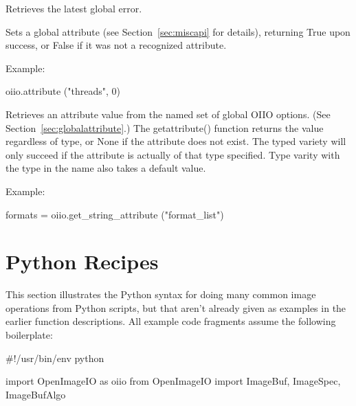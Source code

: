 Retrieves the latest global error.
\apiend

Sets a global attribute (see Section~\ref{sec:miscapi} for details),
returning {\cf True} upon success, or {\cf False} if it was not a
recognized attribute.  

\noindent Example:
\begin{code}
    oiio.attribute ("threads", 0)
\end{code}
\apiend

Retrieves an attribute value from the named set of global OIIO options. (See
Section~\ref{sec:globalattribute}.) The {\cf getattribute()} function
returns the value regardless of type, or {\cf None} if the attribute does
not exist.  The typed variety will only succeed if the attribute is actually
of that type specified. Type varity with the type in the name also takes a
default value.

\noindent Example:
\begin{code}
    formats = oiio.get_string_attribute ("format_list")
\end{code}
\apiend



\section{Python Recipes}
\label{sec:pythonrecipes}

This section illustrates the Python syntax for doing many common image
operations from Python scripts, but that aren't already given as examples
in the earlier function descriptions.  All example code fragments assume the
following boilerplate:

\begin{code}
    #!/usr/bin/env python 
    
    import OpenImageIO as oiio
    from OpenImageIO import ImageBuf, ImageSpec, ImageBufAlgo
\end{code}


